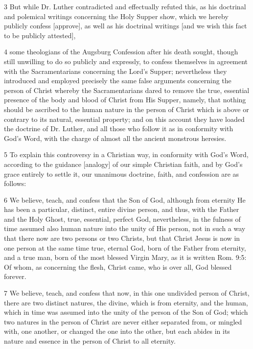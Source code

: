 3 But while Dr. Luther contradicted and effectually refuted this, as his doctrinal and polemical writings concerning the Holy Supper show, which we hereby publicly confess [approve], as well as his doctrinal writings [and we wish this fact to be publicly attested],

4 some theologians of the Augsburg Confession after his death sought, though still unwilling to do so publicly and expressly, to confess themselves in agreement with the Sacramentarians concerning the Lord’s Supper; nevertheless they introduced and employed precisely the same false arguments concerning the person of Christ whereby the Sacramentarians dared to remove the true, essential presence of the body and blood of Christ from His Supper, namely, that nothing should be ascribed to the human nature in the person of Christ which is above or contrary to its natural, essential property; and on this account they have loaded the doctrine of Dr. Luther, and all those who follow it as in conformity with God’s Word, with the charge of almost all the ancient monstrous heresies.

5 To explain this controversy in a Christian way, in conformity with God’s Word, according to the guidance [analogy] of our simple Christian faith, and by God’s grace entirely to settle it, our unanimous doctrine, faith, and confession are as follows:

6 We believe, teach, and confess that the Son of God, although from eternity He has been a particular, distinct, entire divine person, and thus, with the Father and the Holy Ghost, true, essential, perfect God, nevertheless, in the fulness of time assumed also human nature into the unity of His person, not in such a way that there now are two persons or two Christs, but that Christ Jesus is now in one person at the same time true, eternal God, born of the Father from eternity, and a true man, born of the most blessed Virgin Mary, as it is written Rom. 9:5: Of whom, as concerning the flesh, Christ came, who is over all, God blessed forever.

7 We believe, teach, and confess that now, in this one undivided person of Christ, there are two distinct natures, the divine, which is from eternity, and the human, which in time was assumed into the unity of the person of the Son of God; which two natures in the person of Christ are never either separated from, or mingled with, one another, or changed the one into the other, but each abides in its nature and essence in the person of Christ to all eternity.

